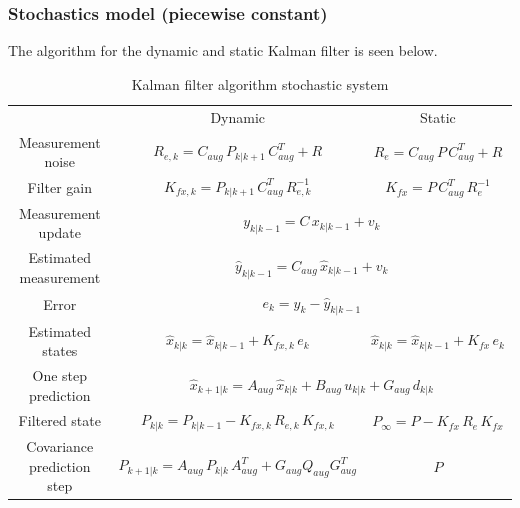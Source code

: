 \subsubsection{Stochastics model (piecewise constant)}
The algorithm for the dynamic and static Kalman filter is seen below.
\begin{table}[H]
    \centering
    \begin{tabular}{c|c|c}
         & Dynamic & Static\\
        Measurement noise & $R_{e,k}=C_{aug}\,P_{k|k+1}\,C_{aug}^T+R$ & $R_{e}=C_{aug}\,P\,C_{aug}^T+R$\\
        Filter gain & $K_{fx,k}=P_{k|k+1}\,C_{aug}^T\,R_{e,k}^{-1}$ & $K_{fx}=P\,C_{aug}^T\,R_e^{-1}$\\
        Measurement update & \multicolumn{2}{c}{$y_{k|k-1}=C\,x_{k|k-1}+v_k$} \\
        Estimated measurement & \multicolumn{2}{c}{$\hat{y}_{k|k-1}=C_{aug}\,\hat{x}_{k|k-1}+v_k$}\\
        Error & \multicolumn{2}{c}{$e_k=y_k-\hat{y}_{k|k-1}$} \\
        Estimated states & $\hat{x}_{k|k}=\hat{x}_{k|k-1}+K_{fx,k}\,e_k$ & $\hat{x}_{k|k}=\hat{x}_{k|k-1}+K_{fx}\,e_k$ \\
        One step prediction & \multicolumn{2}{c}{$\hat{x}_{k+1|k}=A_{aug}\,\hat{x}_{k|k}+B_{aug}\,u_{k|k}+G_{aug}\,d_{k|k}$} \\
        Filtered state  & $P_{k|k}=P_{k|k-1}-K_{fx,k}\,R_{e,k}\,K_{fx,k}$ & $P_{\infty}=P-K_{fx}\,R_{e}\,K_{fx}$\\
        Covariance prediction step & $P_{k+1|k}=A_{aug}\,P_{k|k}\,A_{aug}^T+G_{aug}Q_{aug}G_{aug}^T$ & $P$
    \end{tabular}
    \caption{Kalman filter algorithm stochastic system}
    \label{tab:Kalman_stoc}
\end{table}
